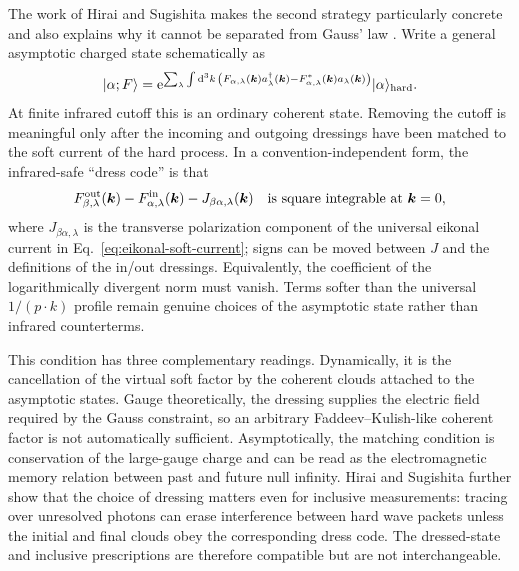 The work of Hirai and Sugishita makes the second strategy particularly
concrete and also explains why it cannot be separated from Gauss' law
\cite{HiraiSugishita:2019,HiraiSugishita:2021,HiraiSugishita:2023}.
Write a general asymptotic charged state schematically as
\begin{equation}
  \lvert \alpha;F \rangle
  =\mathrm{e}^{
    \sum_\lambda\int\mathrm{d}^3k\,
    \left(
      F_{\alpha,\lambda}(\bm k)a_\lambda^\dagger(\bm k)
      -F_{\alpha,\lambda}^*(\bm k)a_\lambda(\bm k)
    \right)
  }\lvert \alpha \rangle_{\mathrm{hard}} .
  \label{eq:general-qed-dressed-state}
\end{equation}
At finite infrared cutoff this is an ordinary coherent state.  Removing the
cutoff is meaningful only after the incoming and outgoing dressings have been
matched to the soft current of the hard process.  In a convention-independent
form, the infrared-safe ``dress code'' is that
\begin{equation}
  F_{\beta,\lambda}^{\mathrm{out}}(\bm k)
  -F_{\alpha,\lambda}^{\mathrm{in}}(\bm k)
  -J_{\beta\alpha,\lambda}(\bm k)
  \quad\hbox{is square integrable at $\bm k=0$} ,
  \label{eq:hirai-sugishita-dress-code}
\end{equation}
where $J_{\beta\alpha,\lambda}$ is the transverse polarization component of
the universal eikonal current in Eq.~\eqref{eq:eikonal-soft-current}; signs can
be moved between $J$ and the definitions of the in/out dressings.  Equivalently,
the coefficient of the logarithmically divergent norm must vanish.  Terms
softer than the universal $1/(p\cdot k)$ profile remain genuine choices of the
asymptotic state rather than infrared counterterms.

This condition has three complementary readings.  Dynamically, it is the
cancellation of the virtual soft factor by the coherent clouds attached to
the asymptotic states.  Gauge theoretically, the dressing supplies the
electric field required by the Gauss constraint, so an arbitrary
Faddeev--Kulish-like coherent factor is not automatically sufficient.
Asymptotically, the matching condition is conservation of the large-gauge
charge and can be read as the electromagnetic memory relation between past
and future null infinity.  Hirai and Sugishita further show that the choice of
dressing matters even for inclusive measurements: tracing over unresolved
photons can erase interference between hard wave packets unless the initial
and final clouds obey the corresponding dress code.  The dressed-state and
inclusive prescriptions are therefore compatible but are not interchangeable.

